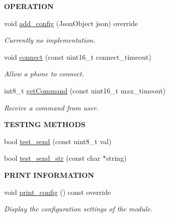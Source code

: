 \begin{Indent}{\bf O\+P\+E\+R\+A\+T\+I\+ON}\par
\begin{DoxyCompactItemize}
\item 
void \hyperlink{class_loom___bluetooth_a6cd69b2bdd618cab4093eed50e0149d4}{add\+\_\+config} (Json\+Object json) override
\begin{DoxyCompactList}\small\item\em Currently no implementation. \end{DoxyCompactList}\item 
void \hyperlink{class_loom___bluetooth_a1f10df313c782cc98f621b423f9071e6}{connect} (const uint16\+\_\+t connect\+\_\+timeout)
\begin{DoxyCompactList}\small\item\em Allow a phone to connect. \end{DoxyCompactList}\item 
int8\+\_\+t \hyperlink{class_loom___bluetooth_af99fabadf5dc67ace74a8c6f00b712c2}{get\+Command} (const uint16\+\_\+t max\+\_\+timeout)
\begin{DoxyCompactList}\small\item\em Receive a command from user. \end{DoxyCompactList}\end{DoxyCompactItemize}
\end{Indent}
\begin{Indent}{\bf T\+E\+S\+T\+I\+NG M\+E\+T\+H\+O\+DS}\par
\begin{DoxyCompactItemize}
\item 
bool \hyperlink{class_loom___bluetooth_a99a5a57a8774104957919b0adabc9945}{test\+\_\+send} (const uint8\+\_\+t val)
\item 
bool \hyperlink{class_loom___bluetooth_a8e2005ed6ef1def9c48169b9fadf5187}{test\+\_\+send\+\_\+str} (const char $\ast$string)
\end{DoxyCompactItemize}
\end{Indent}
\begin{Indent}{\bf P\+R\+I\+NT I\+N\+F\+O\+R\+M\+A\+T\+I\+ON}\par
\begin{DoxyCompactItemize}
\item 
void \hyperlink{class_loom___bluetooth_acf5fbe9ae0476fbc647c742baab183e8}{print\+\_\+config} () const override
\begin{DoxyCompactList}\small\item\em Display the configuration settings of the module. \end{DoxyCompactList}\end{DoxyCompactItemize}
\end{Indent}
